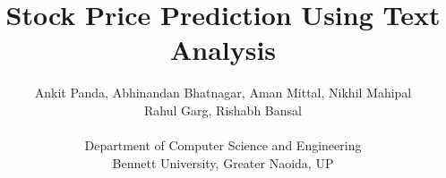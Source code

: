 \documentclass[12pt]{article}
\begin{document}



\title{Stock Price Prediction Using Text Analysis}


\author {Ankit Panda, Abhinandan Bhatnagar, 
Aman Mittal, Nikhil Mahipal\\ Rahul Garg, Rishabh Bansal  \\ \\
Department of Computer Science and Engineering\\
Bennett University, Greater Naoida, UP}
\date{}
\maketitle



\end{document}
